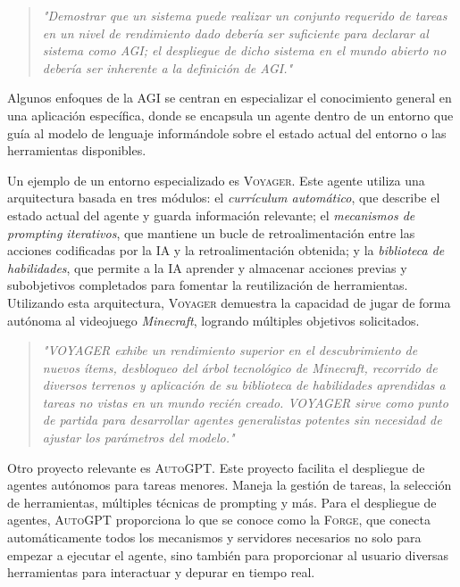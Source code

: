 \begin{quote} \small\textit{
    "Demostrar que un sistema puede realizar un conjunto requerido de tareas en
    un nivel de rendimiento dado debería ser suficiente para declarar al sistema
    como AGI; el despliegue de dicho sistema en el mundo abierto no debería ser
    inherente a la definición de AGI."
\citet{morris2023levels} } \end{quote}

Algunos enfoques de la AGI se centran en especializar el conocimiento general en
una aplicación específica, donde se encapsula un agente dentro de un entorno que
guía al modelo de lenguaje informándole sobre el estado actual del entorno o las herramientas
disponibles.

Un ejemplo de un entorno especializado es \textsc{Voyager}. Este agente
utiliza una arquitectura basada en tres módulos: el \emph{currículum automático},
que describe el estado actual del agente y guarda información relevante; el
\emph{mecanismos de prompting iterativos}, que mantiene un bucle de
retroalimentación entre las acciones codificadas por la IA y la
retroalimentación obtenida; y la \emph{biblioteca de habilidades}, que permite a
la IA aprender y almacenar acciones previas y subobjetivos completados para
fomentar la reutilización de herramientas. Utilizando esta arquitectura,
\textsc{Voyager} demuestra la capacidad de jugar de forma autónoma al
videojuego \emph{Minecraft}, logrando múltiples objetivos solicitados.

\begin{quote} \small\textit{ 
    "VOYAGER exhibe un rendimiento superior en el descubrimiento de nuevos
    ítems, desbloqueo del árbol tecnológico de Minecraft, recorrido de diversos
    terrenos y aplicación de su biblioteca de habilidades aprendidas a tareas no
    vistas en un mundo recién creado. VOYAGER sirve como punto de partida para
    desarrollar agentes generalistas potentes sin necesidad de ajustar los
    parámetros del modelo." 
\citet{wang2023voyager} } \end{quote}

Otro proyecto relevante es \textsc{AutoGPT}. Este proyecto facilita el despliegue de
agentes autónomos para tareas menores. Maneja la gestión de tareas, la selección
de herramientas, múltiples técnicas de prompting y más. Para el despliegue de
agentes, \textsc{AutoGPT} proporciona lo que se conoce como la \textsc{Forge}, que
conecta automáticamente todos los mecanismos y servidores necesarios no solo
para empezar a ejecutar el agente, sino también para proporcionar al usuario
diversas herramientas para interactuar y depurar en tiempo real.

